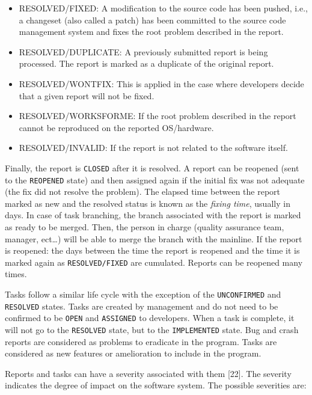 \documentclass[12pt]{report}
\providecommand{\tightlist}{%
  \setlength{\itemsep}{0pt}\setlength{\parskip}{0pt}}
\begin{document}
\begin{itemize}
\tightlist
\item
  RESOLVED/FIXED: A modification to the source code has been pushed,
  i.e., a changeset (also called a patch) has been committed to the
  source code management system and fixes the root problem described in
  the report.
\item
  RESOLVED/DUPLICATE: A previously submitted report is being processed.
  The report is marked as a duplicate of the original report.
\item
  RESOLVED/WONTFIX: This is applied in the case where developers decide
  that a given report will not be fixed.
\item
  RESOLVED/WORKSFORME: If the root problem described in the report
  cannot be reproduced on the reported OS/hardware.
\item
  RESOLVED/INVALID: If the report is not related to the software itself.
\end{itemize}

Finally, the report is \lstinline!CLOSED! after it is resolved. A report
can be reopened (sent to the \lstinline!REOPENED! state) and then
assigned again if the initial fix was not adequate (the fix did not
resolve the problem). The elapsed time between the report marked as new
and the resolved status is known as the \emph{fixing time}, usually in
days. In case of task branching, the branch associated with the report
is marked as ready to be merged. Then, the person in charge (quality
assurance team, manager, ect\ldots{}) will be able to merge the branch
with the mainline. If the report is reopened: the days between the time
the report is reopened and the time it is marked again as
\lstinline!RESOLVED/FIXED! are cumulated. Reports can be reopened many
times.

Tasks follow a similar life cycle with the exception of the
\lstinline!UNCONFIRMED! and \lstinline!RESOLVED! states. Tasks are
created by management and do not need to be confirmed to be
\lstinline!OPEN! and \lstinline!ASSIGNED! to developers. When a task is
complete, it will not go to the \lstinline!RESOLVED! state, but to the
\lstinline!IMPLEMENTED! state. Bug and crash reports are considered as
problems to eradicate in the program. Tasks are considered as new
features or amelioration to include in the program.

Reports and tasks can have a severity associated with them {[}22{]}. The
severity indicates the degree of impact on the software system. The
possible severities are:
\end{document}
